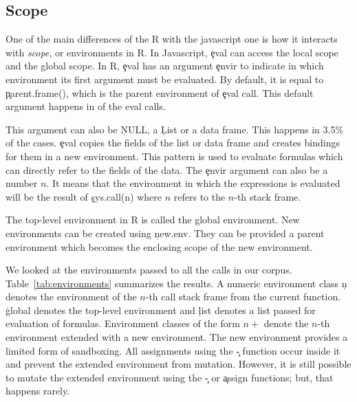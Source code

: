 \documentclass[conference]{IEEEtran}
\begin{document}
\subsection{Scope}

One of the main differences of the R \eval with the javascript one is how it
interacts with \emph{scope}, or environments in R. In Javascript, \c{eval} can
access the local scope and the global scope. In R, \c{eval} has an argument
\c{envir} to indicate in which environment its first argument must be evaluated.
By default, it is equal to \c{parent.frame()}, 
which is the parent environment of \c{eval} call. This default argument
happens in \DefaultEnvirExprPercent of the eval calls.

This argument can also be \c{NULL}, a \c{List} or a data frame. This happens in
3.5\% of the cases.
\c{eval} copies the fields of the list or data frame and creates bindings for
them in a new environment. This pattern is used to evaluate formulas which can
directly refer to the fields of the data.
The \c{envir} argument can also be a number $n$. It means that the environment in
which the expressions is evaluated will be the result of \c{sys.call(n)} where
$n$ refers to the $n$-th stack frame.

The top-level environment in R is called the global environment. New
environments can be created using \c{new.env}. They can be provided a parent
environment which becomes the enclosing scope of the new environment.

We looked at the environments passed to all the \eval calls in our corpus.
Table~\ref{tab:environments} summarizes the results. A numeric environment class
\c{n} denotes the environment of the $n$-th call stack frame from the current
function. \c{global} denotes the top-level environment and \c{list} denotes a list
passed for evaluation of formulas. Environment classes of the form $n+$ denote
the $n$-th environment extended with a new environment. The new environment
provides a limited form of sandboxing. All assignments using the \c{\<-}
function occur inside it and prevent the extended environment from
mutation. However, it is still possible to mutate the extended environment
using the \c{\<\<-} or \c{assign} functions; but, that happens rarely.
\end{document}
